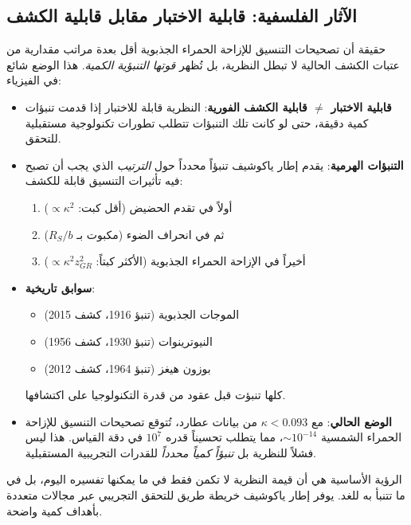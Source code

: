\documentclass[11pt,a4paper]{article}
\begin{document}
	\subsection{الآثار الفلسفية: قابلية الاختبار مقابل قابلية الكشف}
	\label{subsec:philosophy-testability}
	
	حقيقة أن تصحيحات التنسيق للإزاحة الحمراء الجذبوية أقل بعدة مراتب مقدارية من عتبات الكشف الحالية لا تبطل النظرية، بل تُظهر \emph{قوتها التنبؤية الكمية}. هذا الوضع شائع في الفيزياء:
	
	\begin{itemize}
		\item \textbf{قابلية الاختبار $\neq$ قابلية الكشف الفورية}: النظرية قابلة للاختبار إذا قدمت تنبؤات كمية دقيقة، حتى لو كانت تلك التنبؤات تتطلب تطورات تكنولوجية مستقبلية للتحقق.
		
		\item \textbf{التنبؤات الهرمية}: يقدم إطار ياكوشيف تنبؤاً محدداً حول \emph{الترتيب} الذي يجب أن تصبح فيه تأثيرات التنسيق قابلة للكشف:
		\begin{enumerate}
			\item أولاً في تقدم الحضيض (أقل كبت: $\propto \kappa^2$)
			\item ثم في انحراف الضوء (مكبوت بـ $R_S/b$)
			\item أخيراً في الإزاحة الحمراء الجذبوية (الأكثر كبتاً: $\propto \kappa^2 z_{GR}^2$)
		\end{enumerate}
		
		\item \textbf{سوابق تاريخية}:
		\begin{itemize}
			\item الموجات الجذبوية (تنبؤ 1916، كشف 2015)
			\item النيوترينوات (تنبؤ 1930، كشف 1956)
			\item بوزون هيغز (تنبؤ 1964، كشف 2012)
		\end{itemize}
		كلها تنبؤت قبل عقود من قدرة التكنولوجيا على اكتشافها.
		
		\item \textbf{الوضع الحالي}: مع $\kappa < 0.093$ من بيانات عطارد، تُتوقع تصحيحات التنسيق للإزاحة الحمراء الشمسية $\sim 10^{-14}$، مما يتطلب تحسيناً قدره $10^7$ في دقة القياس. هذا ليس فشلاً للنظرية بل \emph{تنبؤاً كمياً محدداً} للقدرات التجريبية المستقبلية.
	\end{itemize}
	
	الرؤية الأساسية هي أن قيمة النظرية لا تكمن فقط في ما يمكنها تفسيره اليوم، بل في ما تتنبأ به للغد. يوفر إطار ياكوشيف خريطة طريق للتحقق التجريبي عبر مجالات متعددة بأهداف كمية واضحة.
	
\end{document}
